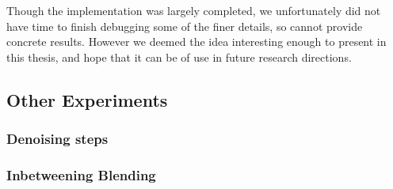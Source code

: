 Though the implementation was largely completed, we unfortunately did not have time to finish debugging some of the finer details, so cannot provide concrete results. However we deemed the idea interesting enough to present in this thesis, and hope that it can be of use in future research directions.



\subsection{Other Experiments}
\subsubsection{Denoising steps}

\subsubsection{Inbetweening Blending}
\TODO{}